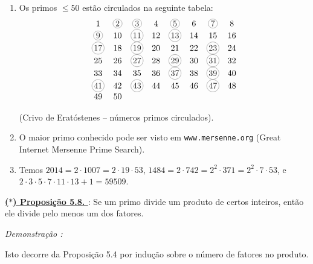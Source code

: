         \begin{exemplo}
            \begin{enumerate}[left=0.5cm, align=left, nosep]
                \item Os primos $\leq 50$ estão circulados na seguinte tabela:   
                \[
                    \begin{array}{cccccccc}
                    1 & \circled{2} & \circled{3} & 4 & \circled{5} & 6 & \circled{7} & 8 \\
                    \circled{9} & 10 & \circled{11} & 12 & \circled{13} & 14 & 15 & 16 \\
                    \circled{17} & 18 & \circled{19} & 20 & 21 & 22 & \circled{23} & 24 \\
                    25 & 26 & \circled{27} & 28 & \circled{29} & 30 & \circled{31} & 32 \\
                    33 & 34 & 35 & 36 & \circled{37} & 38 & \circled{39} & 40 \\
                    \circled{41} & 42 & \circled{43} & 44 & 45 & 46 & \circled{47} & 48 \\
                    49 & 50 &   &   &   &   &   &   
                    \end{array}
                \]

                \begin{center}
                    (Crivo de Eratóstenes – números primos circulados).      
                \end{center}
        
                \item O maior primo conhecido pode ser visto em \texttt{www.mersenne.org} (Great Internet Mersenne Prime Search).  
                \item Temos $2014 = 2 \cdot 1007 = 2 \cdot 19 \cdot 53$, $1484 = 2 \cdot 742 = 2^2 \cdot 371 = 2^2 \cdot 7 \cdot 53$, e $2 \cdot 3 \cdot 5 \cdot 7 \cdot 11 \cdot 13 + 1 = 59509$.  
            \end{enumerate}
        \end{exemplo}

        \underline{\underline{ \textbf{\textcolor{cinzaEscuro}{($\ast$) Proposição 5.8. }} }} : Se um primo divide um produto de certos inteiros, então ele divide pelo menos um dos fatores.  

        \noindent\textit{Demonstração : }

            Isto decorre da Proposição 5.4 por indução sobre o número de fatores no produto.

